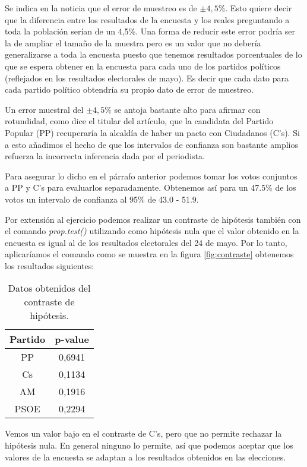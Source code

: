 \documentclass[11pt,a4paper]{article}
\begin{document}
Se indica en la noticia que el error de muestreo es de $\pm4,5\%$. Esto quiere decir que la diferencia entre los resultados de la encuesta y los reales preguntando a toda la población serían de un 4,5\%. Una forma de reducir este error podría ser la de ampliar el tamaño de la muestra pero es un valor que no debería generalizarse a toda la encuesta puesto que tenemos resultados porcentuales de lo que se espera obtener en la encuesta para cada uno de los partidos políticos (reflejados en los resultados electorales de mayo). Es decir que cada dato para cada partido político obtendría su propio dato de error de muestreo.

Un error muestral del $\pm4,5\%$ se antoja bastante alto para afirmar con rotundidad, como dice el titular del artículo, que la candidata del  Partido Popular (PP) recuperaría la alcaldía de haber un pacto con Ciudadanos (C's). Si a esto añadimos el hecho de que los intervalos de confianza son bastante amplios refuerza la incorrecta inferencia dada por el periodista.

Para asegurar lo dicho en el párrafo anterior podemos tomar los votos conjuntos a PP y C's para evaluarlos separadamente. Obtenemos así para un 47.5\% de los votos un intervalo de confianza al 95\% de 43.0 - 51.9.

Por extensión al ejercicio podemos realizar un contraste de hipótesis también con el comando \textit{prop.test()} utilizando como hipótesis nula que el valor obtenido en la encuesta es igual al de los resultados electorales del 24 de mayo. Por lo tanto, aplicaríamos el comando como se muestra en la figura \ref{fig:contraste} obtenemos los resultados siguientes:

\begin{table}[ht]
	\centering
	\begin{tabular}{cc}
	\toprule[0.4mm]
	Partido & p-value\\
	\midrule
	PP & {\color{green} 0,6941} \\
	Cs & {\color{green} 0,1134} \\
	AM & {\color{green} 0,1916} \\
	PSOE & {\color{green} 0,2294} \\
	\bottomrule[0.4mm]
	\end{tabular}
	\caption{Datos obtenidos del contraste de hipótesis.}
\label{tab:contraste}
\end{table}

Vemos un valor bajo en el contraste de C's, pero que no permite rechazar la hipótesis nula. En general ninguno lo permite, así que podemos aceptar que los valores de la encuesta se adaptan a los resultados obtenidos en las elecciones.
\end{document}
